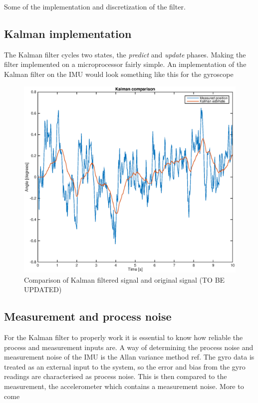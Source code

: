 \documentclass[a4paper,11pt]{kth-mag}
\begin{document}
Some of the implementation and discretization of the filter.
\subsection{Kalman implementation}
The Kalman filter cycles two states, the \textit{predict} and \textit{update} phases. Making the filter implemented on a microprocessor fairly simple. 
An implementation of the Kalman filter on the IMU would look something like this for the gyroscope





\begin{figure}[!htb]
\centering
\includegraphics[scale=.7]{Kalmancomparisonplot.eps}
\caption{Comparison of Kalman filtered signal and original signal (TO BE UPDATED)}
\label{fig:Kalman comparison}
\end{figure}



\subsection{Measurement and process noise} \label{chapter:Allan Variance}
For the Kalman filter to properly work it is essential to know how reliable the process and measurement inputs are. A way of determining the process noise and measurement noise of the IMU is the Allan variance method ref.
The gyro data is treated as an external input to the system, so the error and bias from the gyro readings are characterised as process noise. This is then compared to the measurement, the accelerometer which contains a measurement noise.
More to come
\end{document}
